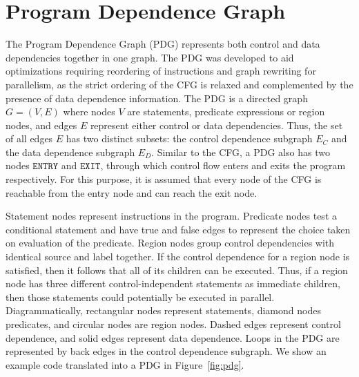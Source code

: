 \section{Program Dependence Graph}
\label{section:vsdg:pdg}
The Program Dependence Graph (PDG) represents both control and data dependencies together in one graph. 
The PDG was developed to aid optimizations requiring reordering of instructions and graph rewriting for parallelism, as the strict ordering of the CFG is relaxed and complemented by the presence of data dependence information. 
The PDG is a directed graph $G=(V,E)$ where nodes $V$ are statements, predicate expressions or region nodes, and edges $E$ represent either control or data dependencies. 
Thus, the set of all edges $E$ has two distinct subsets: 
the control dependence subgraph $E_{C}$ and the data dependence subgraph $E_{D}$.
Similar to the CFG, a PDG also has two nodes $\texttt{ENTRY}$ and $\texttt{EXIT}$, through which control flow enters and exits the program respectively. 
For this purpose, it is assumed that every node of the CFG is reachable from the entry node and can reach the exit node.

Statement nodes represent instructions in the program. 
Predicate nodes test a conditional statement and have {\sf true} and {\sf false} edges to represent the choice taken on evaluation of the predicate. 
Region nodes group control dependencies with identical source and label together. 
If the control dependence for a region node is satisfied, then it follows that all of its children can be executed. 
Thus, if a region node has three different control-independent statements as immediate children, then those statements could potentially be executed in parallel. 
Diagrammatically, rectangular nodes represent statements, diamond nodes predicates, and circular nodes are region nodes. 
Dashed edges represent control dependence, and solid edges represent data dependence. 
Loops in the PDG are represented by back edges in the control dependence subgraph. 
We show an example code translated into a PDG in Figure~\ref{fig:pdg}.

